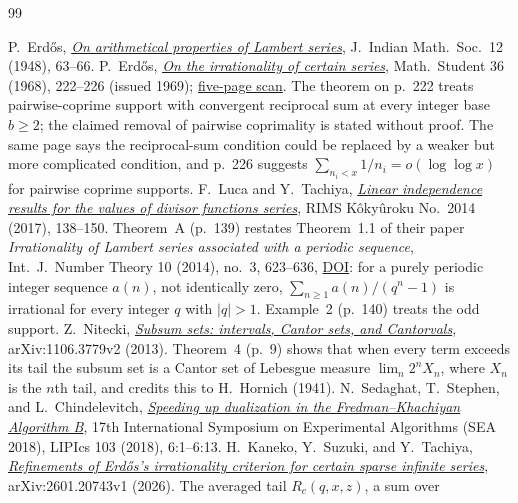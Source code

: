 \documentclass[11pt]{article}
\theoremstyle{plain}
\theoremstyle{definition}
\theoremstyle{remark}
\begin{document}
\begin{thebibliography}{99}
\small
\raggedright
\setlength{\itemsep}{0pt}
 P.~Erd\H{o}s,
  \href{https://www.renyi.hu/~p_erdos/1948-04.pdf}{\emph{On arithmetical
  properties of Lambert series}}, J.~Indian Math.\ Soc.\ 12 (1948), 63--66.
 P.~Erd\H{o}s,
  \href{https://users.renyi.hu/~p_erdos/1969-09.pdf}{\emph{On the
  irrationality of certain series}}, Math.\ Student 36 (1968), 222--226
  (issued 1969); \href{https://www.renyi.hu/~p_erdos/1969-09.pdf}{five-page scan}.  The theorem on p.~222 treats pairwise-coprime support with
  convergent reciprocal sum at every integer base $b\ge2$; the claimed
  removal of pairwise coprimality is stated without proof.  The same page
  says the reciprocal-sum condition could be replaced by a weaker but more
  complicated condition, and p.~226 suggests
  $\sum_{n_i<x}1/n_i=o(\log\log x)$ for pairwise coprime supports.
 F.~Luca and Y.~Tachiya,
  \href{https://www.kurims.kyoto-u.ac.jp/~kyodo/kokyuroku/contents/pdf/2014-14.pdf}
  {\emph{Linear independence results for the values of divisor functions
  series}}, RIMS K\^oky\^uroku No.~2014 (2017), 138--150.  Theorem~A (p.~139)
  restates Theorem~1.1 of their paper \emph{Irrationality of Lambert series
  associated with a periodic sequence}, Int.\ J.~Number Theory 10 (2014),
  no.~3, 623--636,
  \href{https://doi.org/10.1142/S1793042113501121}{DOI}: for a purely periodic
  integer sequence $a(n)$, not identically zero,
  $\sum_{n\ge1}a(n)/(q^n-1)$ is irrational for every integer $q$ with $|q|>1$.
  Example~2 (p.~140) treats the odd support.
 Z.~Nitecki,
  \href{https://arxiv.org/abs/1106.3779v2}{\emph{Subsum sets: intervals, Cantor
  sets, and Cantorvals}}, arXiv:1106.3779v2 (2013).  Theorem~4 (p.~9) shows
  that when every term exceeds its tail the subsum set is a Cantor set of
  Lebesgue measure $\lim_n2^nX_n$, where $X_n$ is the $n$th tail, and credits
  this to H.~Hornich (1941).
 N.~Sedaghat, T.~Stephen, and
  L.~Chindelevitch, \href{https://doi.org/10.4230/LIPIcs.SEA.2018.6}
  {\emph{Speeding up dualization in the Fredman--Khachiyan Algorithm B}},
  17th International Symposium on Experimental Algorithms (SEA 2018),
  LIPIcs 103 (2018), 6:1--6:13.
 H.~Kaneko, Y.~Suzuki, and Y.~Tachiya,
  \href{https://arxiv.org/abs/2601.20743v1}{\emph{Refinements of Erd\H{o}s's
  irrationality criterion for certain sparse infinite series}},
  arXiv:2601.20743v1 (2026).  The averaged tail $R_c(q,x,z)$, a sum over

\end{thebibliography}
\end{document}
